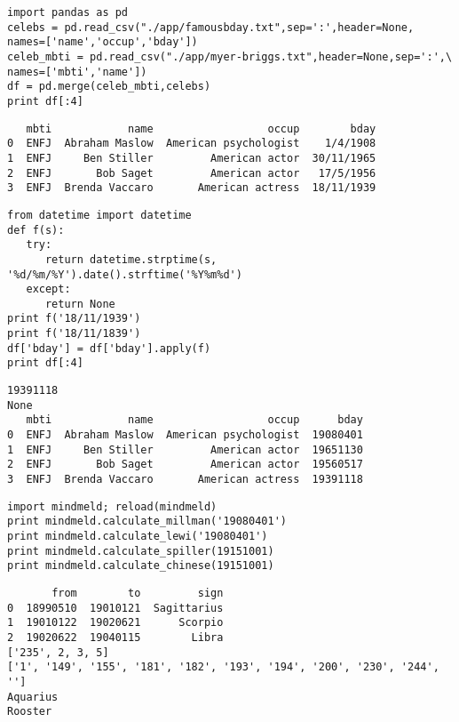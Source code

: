\documentclass[12pt,fleqn]{article}\usepackage{common}
\begin{document}
\begin{verbatim}
import pandas as pd
celebs = pd.read_csv("./app/famousbday.txt",sep=':',header=None, 
names=['name','occup','bday'])
celeb_mbti = pd.read_csv("./app/myer-briggs.txt",header=None,sep=':',\
names=['mbti','name'])
df = pd.merge(celeb_mbti,celebs)
print df[:4]
\end{verbatim}

\begin{verbatim}
   mbti            name                  occup        bday
0  ENFJ  Abraham Maslow  American psychologist    1/4/1908
1  ENFJ     Ben Stiller         American actor  30/11/1965
2  ENFJ       Bob Saget         American actor   17/5/1956
3  ENFJ  Brenda Vaccaro       American actress  18/11/1939
\end{verbatim}

\begin{verbatim}
from datetime import datetime
def f(s):
   try:
      return datetime.strptime(s, '%d/%m/%Y').date().strftime('%Y%m%d')
   except: 
      return None
print f('18/11/1939')
print f('18/11/1839')
df['bday'] = df['bday'].apply(f)
print df[:4]
\end{verbatim}

\begin{verbatim}
19391118
None
   mbti            name                  occup      bday
0  ENFJ  Abraham Maslow  American psychologist  19080401
1  ENFJ     Ben Stiller         American actor  19651130
2  ENFJ       Bob Saget         American actor  19560517
3  ENFJ  Brenda Vaccaro       American actress  19391118
\end{verbatim}

\begin{verbatim}
import mindmeld; reload(mindmeld)
print mindmeld.calculate_millman('19080401')
print mindmeld.calculate_lewi('19080401')
print mindmeld.calculate_spiller(19151001)
print mindmeld.calculate_chinese(19151001)
\end{verbatim}

\begin{verbatim}
       from        to         sign
0  18990510  19010121  Sagittarius
1  19010122  19020621      Scorpio
2  19020622  19040115        Libra
['235', 2, 3, 5]
['1', '149', '155', '181', '182', '193', '194', '200', '230', '244', '']
Aquarius
Rooster
\end{verbatim}

\begin{verbatim}
\end{verbatim}
\end{document}

